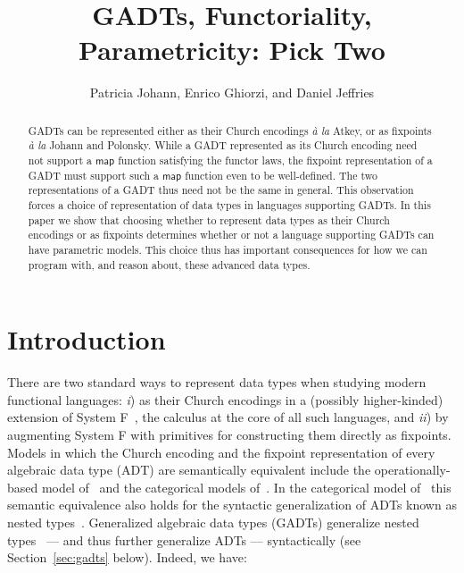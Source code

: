 \documentclass[submission,copyright,creativecommons]{eptcs}
\title{GADTs, Functoriality,  Parametricity: Pick Two}
\author{Patricia Johann, Enrico Ghiorzi, and Daniel Jeffries
\institute{Appalachian State University}
\email{johannp@appstate.edu, ghiorzie@appstate.edu,
  jeffriesd@appstate.edu}}
\begin{document}
\maketitle

\begin{abstract}
GADTs can be represented either as their Church encodings {\em \`a la}
Atkey, or as fixpoints {\em \`a la} Johann and Polonsky. While a GADT
represented as its Church encoding need not support a $\mathsf{map}$
function satisfying the functor laws, the fixpoint representation of a
GADT must support such a $\mathsf{map}$ function even to be
well-defined. The two representations of a GADT thus need not be the
same in general. This observation forces a choice of representation of
data types in languages supporting GADTs.  In this paper we show that
choosing whether to represent data types as their Church encodings or
as fixpoints determines whether or not a language supporting GADTs can
have parametric models. This choice thus has important consequences
for how we can program with, and reason about, these advanced data
types.
\end{abstract}

\maketitle

\section{Introduction}\label{sec:intro}

There are two standard ways to represent data types when studying
modern functional languages: {\em i}) as their Church encodings in a
(possibly higher-kinded) extension of System F~\cite{gir72}, the
calculus at the core of all such languages, and {\em ii}) by
augmenting System F with primitives for constructing them directly as
fixpoints.  Models in which the Church encoding and the fixpoint
representation of every algebraic data type (ADT) are semantically
equivalent include the operationally-based model of~\cite{pit98,pit00}
and the categorical models of~\cite{joh02,joh03,jgj21}.  In the
categorical model of~\cite{jgj21} this semantic equivalence also holds
for the syntactic generalization of ADTs known as nested
types~\cite{bm98}. Generalized algebraic data types (GADTs) generalize
nested types~\cite{pvww06} --- and thus further generalize ADTs ---
syntactically (see Section~\ref{sec:gadts} below).  Indeed, we have:
\end{document}

